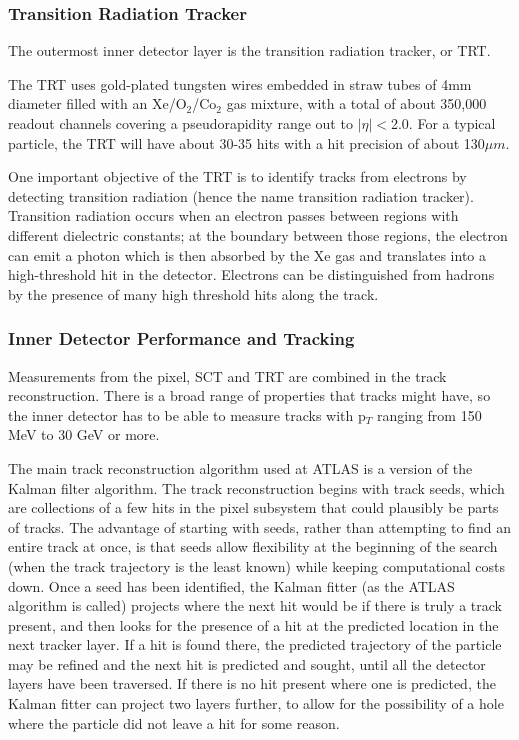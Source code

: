 \subsubsection{Transition Radiation Tracker}
\label{sec:trt}
The outermost inner detector layer is the transition radiation tracker, or TRT.  

The TRT uses gold-plated tungsten wires embedded in straw tubes of 4mm diameter filled with an Xe/O$_2$/Co$_2$ gas mixture, with a total of about 350,000 readout channels covering a pseudorapidity range out to $|\eta|<$2.0.  For a typical particle, the TRT will have about 30-35 hits with a hit precision of about 130$\mu m$.

One important objective of the TRT is to identify tracks from electrons by detecting transition radiation (hence the name transition radiation tracker).  Transition radiation occurs when an electron passes between regions with different dielectric constants; at the boundary between those regions, the electron can emit a photon which is then absorbed by the Xe gas and translates into a high-threshold hit in the detector.  Electrons can be distinguished from hadrons by the presence of many high threshold hits along the track.

 
\subsubsection{Inner Detector Performance and Tracking}
\label{sec:id_perf}
Measurements from the pixel, SCT and TRT are combined in the track reconstruction.  There is a broad range of properties that tracks might have, so the inner detector has to be able to measure tracks with p$_T$ ranging from 150 MeV to 30 GeV or more.   

The main track reconstruction algorithm used at ATLAS is a version of the Kalman filter algorithm.  The track reconstruction begins with track seeds, which are collections of a few hits in the pixel subsystem that could plausibly be parts of tracks.  The advantage of starting with seeds, rather than attempting to find an entire track at once, is that seeds allow flexibility at the beginning of the search (when the track trajectory is the least known) while keeping computational costs down.  Once a seed has been identified, the Kalman fitter (as the ATLAS algorithm is called) projects where the next hit would be if there is truly a track present, and then looks for the presence of a hit at the predicted location in the next tracker layer.  If a hit is found there, the predicted trajectory of the particle may be refined and the next hit is predicted and sought, until all the detector layers have been traversed. If there is no hit present where one is predicted, the Kalman fitter can project two layers further, to allow for the possibility of a hole where the particle did not leave a hit for some reason. 

